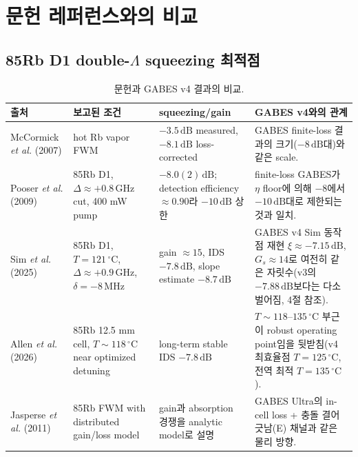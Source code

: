 \documentclass[11pt,a4paper]{article}
\newcommand{\dB}{\,\mathrm{dB}}
\newcommand{\GHz}{\,\mathrm{GHz}}
\newcommand{\MHz}{\,\mathrm{MHz}}
\newcommand{\degC}{\,^{\circ}\mathrm{C}}
\begin{document}
\section{문헌 레퍼런스와의 비교}

\subsection{85Rb D1 double-$\Lambda$ squeezing 최적점}
\begin{table}[h]
\centering
\caption{문헌과 GABES v4 결과의 비교.}
\label{tab:literature}
\begin{tabular}{p{3.3cm}p{3.4cm}p{3.0cm}p{4.8cm}}
\toprule
출처 & 보고된 조건 & squeezing/gain & GABES v4와의 관계\\
\midrule
McCormick \textit{et al.} (2007) &
hot Rb vapor FWM &
$-3.5\dB$ measured, $-8.1\dB$ loss-corrected &
GABES finite-loss 결과의 크기($-8\dB$대)와 같은 scale.\\
\addlinespace
Pooser \textit{et al.} (2009) &
85Rb D1, $\Delta\approx+0.8\GHz$ cut, 400 mW pump &
$-8.0(2)\dB$; detection efficiency $\approx0.90$라 $-10\dB$ 상한 &
finite-loss GABES가 $\eta$ floor에 의해 $-8$에서 $-10\dB$대로 제한되는 것과 일치.\\
\addlinespace
Sim \textit{et al.} (2025) &
85Rb D1, $T=121\degC$, $\Delta\approx+0.9\GHz$, $\delta=-8\MHz$ &
gain $\approx15$, IDS $-7.8\dB$, slope estimate $-8.7\dB$ &
GABES v4 Sim 동작점 재현 $\xi\approx-7.15\dB$, $G_s\approx14$로 여전히 같은
자릿수(v3의 $-7.88\dB$보다는 다소 벌어짐, 4절 참조).\\
\addlinespace
Allen \textit{et al.} (2026) &
85Rb 12.5 mm cell, $T\sim118\degC$ near optimized detuning &
long-term stable IDS $-7.8\dB$ &
$T\sim118$--$135\degC$ 부근이 robust operating point임을 뒷받침(v4 최효율점
$T=125\degC$, 전역 최적 $T=135\degC$).\\
\addlinespace
Jasperse \textit{et al.} (2011) &
85Rb FWM with distributed gain/loss model &
gain과 absorption 경쟁을 analytic model로 설명 &
GABES Ultra의 in-cell loss + 충돌 결어긋남(E) 채널과 같은 물리 방향.\\
\bottomrule
\end{tabular}
\end{table}
\end{document}
